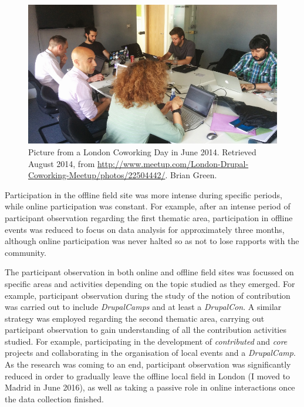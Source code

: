 \begin{figure}[H]
    \centering
\includegraphics[scale=0.45]{img/events/drupal_coworking_day.jpeg}
    \caption[London Drupal Coworking day]%
    {Picture from a London Coworking Day in June 2014. Retrieved  August 2014, from \url{http://www.meetup.com/London-Drupal-Coworking-Meetup/photos/22504442/}. Brian Green.}
    \label{drupal-coworking}
\end{figure}

Participation in the offline field site was more intense during specific periods, while online participation was constant. For example, after an intense period of participant observation regarding the first thematic area, participation in offline events was reduced to focus on data analysis for approximately three months, although online participation was never halted so as not to lose rapports with the community.

The participant observation in both online and offline field sites was focussed on specific areas and activities depending on the topic studied as they emerged. For example, participant observation during the study of the notion of contribution was carried out to include \textit{DrupalCamps} and at least a \textit{DrupalCon}. A similar strategy was employed regarding the second thematic area, carrying out participant observation to gain understanding of all the contribution activities studied. For example, participating in the development of \textit{contributed} and \textit{core} projects and collaborating in the organisation of local events and a \textit{DrupalCamp}. As the research was coming to an end, participant observation was significantly reduced in order to gradually leave the offline local field in London (I moved to Madrid in June 2016), as well as taking a passive role in online interactions once the data collection finished.

